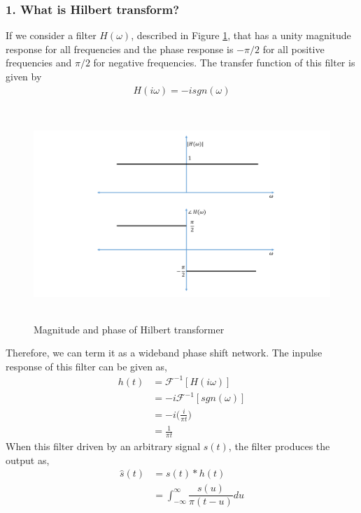 \subsubsection{1. What is Hilbert transform?}
If we consider a filter $H(\omega)$, described in Figure \ref{Hilbert_Transformer}, that has a unity magnitude response for all frequencies and the phase response is $-\pi/2$ for all positive frequencies and $\pi/2$ for negative frequencies. The transfer function of this filter is given by
\begin{equation}
\begin{split}
H(i\omega)=-isgn(\omega)
\end{split}
\label{}
\end{equation}
\begin{figure}[h]
	\centering
	\includegraphics[width=1.0\textwidth, height=8cm]{./sdf/simplified_coherent_receiver/figures/HT.pdf}
	\caption{Magnitude and phase of Hilbert transformer}\label{Hilbert_Transformer}
\end{figure}
Therefore, we can term it as a wideband phase shift network. The inpulse response of this filter can be given as,
\begin{equation}
\begin{split}
h(t)&=\mathcal{F}^{-1}[H(i\omega)]\\
&=-i\mathcal{F}^{-1}[sgn(\omega)]\\
&=-i\bigg(\frac{i}{\pi t}\bigg)\\
&=\frac{1}{\pi t}
\end{split}
\label{}
\end{equation}
When this filter driven by an arbitrary signal $s(t)$, the filter produces the output as,
\begin{equation}
\begin{split}
\hat{s}(t)&=s(t) * h(t)\\
&=\int_{-\infty}^{\infty} \dfrac{s(u)}{\pi(t-u)}du\\
\end{split}
\label{}
\end{equation}
